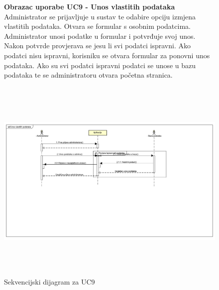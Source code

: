 				\begin{figure}[H]
					\textbf{Obrazac uporabe UC9 - Unos vlastitih podataka} 
					\newline
					\newline
					Administrator se prijavljuje u sustav te odabire opciju izmjena vlastitih podataka. Otvara se formular s osobnim podatcima. Administrator unosi podatke u formular i potvrđuje svoj unos. Nakon potvrde provjerava se jesu li svi podatci ispravni. Ako podatci nisu ispravni, korisniku se otvara formular za ponovni unos podataka. Ako su svi podatci ispravni podatci se unose u bazu podataka te se administratoru otvara početna stranica. \par
					\includegraphics[width=170mm,height=100mm]{slike/Unos_vlastitih_podataka.png} 
					\newline
					\centering
					\caption{Sekvencijski dijagram za UC9}
					\label{fig:promjene}
				\end{figure}
				
